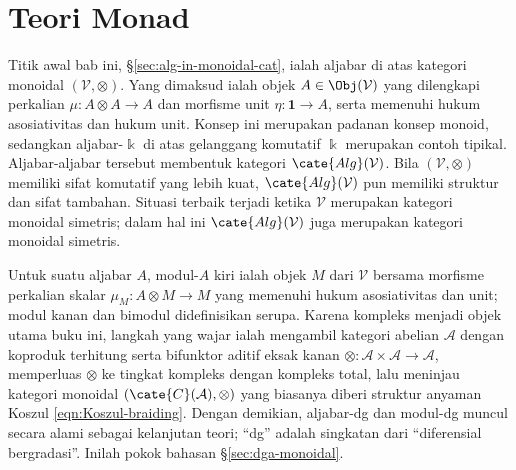 
\chapter{Teori Monad}\label{sec:monads}
\hypertarget{o014.aljabr2.chapter7.monoidal-algebras}{ }

Titik awal bab ini, \S\ref{sec:alg-in-monoidal-cat}, ialah aljabar di atas
kategori monoidal $(\mathcal{V},\otimes)$. Yang dimaksud ialah objek
$A\in\Obj(\mathcal{V})$ yang dilengkapi perkalian
$\mu:A\otimes A\to A$ dan morfisme unit $\eta:\mathbf{1}\to A$, serta
	memenuhi hukum asosiativitas dan hukum unit. Konsep ini merupakan padanan konsep monoid,
sedangkan aljabar-$\Bbbk$ di atas gelanggang komutatif $\Bbbk$ merupakan
contoh tipikal. Aljabar-aljabar tersebut membentuk kategori
$\cate{Alg}(\mathcal{V})$. Bila $(\mathcal{V},\otimes)$ memiliki sifat
komutatif yang lebih kuat, $\cate{Alg}(\mathcal{V})$ pun memiliki struktur dan
sifat tambahan. Situasi terbaik terjadi ketika $\mathcal{V}$ merupakan
kategori monoidal simetris; dalam hal ini $\cate{Alg}(\mathcal{V})$ juga
merupakan kategori monoidal simetris.

Untuk suatu aljabar $A$, modul-$A$ kiri ialah objek $M$ dari $\mathcal{V}$
bersama morfisme perkalian skalar $\mu_M:A\otimes M\to M$ yang memenuhi hukum
asosiativitas dan unit; modul kanan dan bimodul didefinisikan serupa. Karena
	kompleks menjadi objek utama buku ini, langkah yang wajar ialah
mengambil kategori abelian $\mathcal{A}$ dengan koproduk terhitung serta
bifunktor aditif eksak kanan
$\otimes:\mathcal{A}\times\mathcal{A}\to\mathcal{A}$, memperluas $\otimes$
ke tingkat kompleks dengan kompleks total, lalu meninjau kategori monoidal
$(\cate{C}(\mathcal{A}),\otimes)$ yang biasanya diberi struktur anyaman Koszul
\eqref{eqn:Koszul-braiding}. Dengan demikian, aljabar-dg dan modul-dg muncul
secara alami sebagai kelanjutan teori; ``dg'' adalah singkatan dari
``diferensial bergradasi''. Inilah pokok bahasan
\S\ref{sec:dga-monoidal}.

